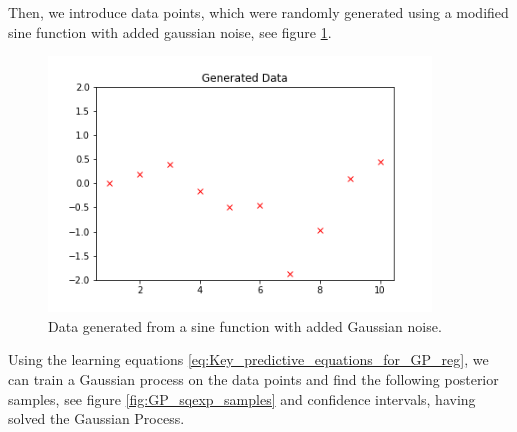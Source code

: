 Then, we introduce data points, which were randomly generated using a modified sine function with added gaussian noise, see figure \ref{fig:generated_data}. 
\begin{figure}[h!]%
	\centering
	\includegraphics[width=4in]{img/05_3/generated_data.png}
	\caption[Random data from sine function with Gaussian noise]
	{Data generated from a sine function with added Gaussian noise.}
	\label{fig:generated_data}
\end{figure}
Using the learning equations \ref{eq:Key_predictive_equations_for_GP_reg}, we can train a Gaussian process on the data points and find the following posterior samples, see figure \ref{fig:GP_sqexp_samples} and confidence intervals, having solved the Gaussian Process. 

